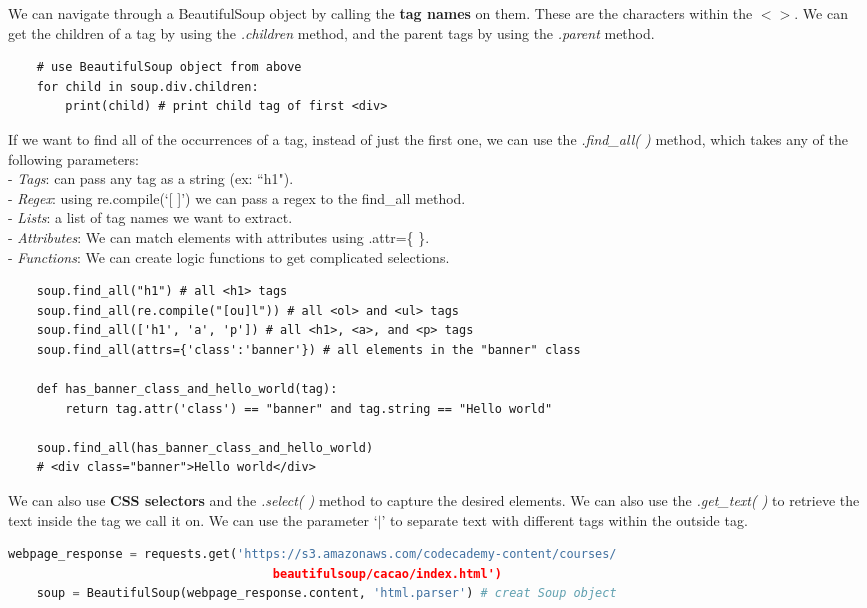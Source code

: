 \documentclass[11pt, a4paper]{article}
\begin{document}
\begin{spacing}{1.1}
	\noindent We can navigate through a BeautifulSoup object by calling the \textbf{tag names} on them. These are the characters within the $< >$. We can get the children of a tag by using the \textit{.children} method, and the parent tags by using the \textit{.parent} method.
	\begin{lstlisting}
	# use BeautifulSoup object from above
	for child in soup.div.children:
		print(child) # print child tag of first <div> \end{lstlisting}\vspace*{1mm} 
	If we want to find all of the occurrences of a tag, instead of just the first one, we can use the \textit{.find\_all( )} method, which takes any of the following parameters: \\
	\hspace*{3mm} - \textit{Tags}: can pass any tag as a string (ex: ``h1"). \\
	\hspace*{3mm} - \textit{Regex}: using re.compile(`[ ]') we can pass a regex to the find\_all method. \\
	\hspace*{3mm} - \textit{Lists}: a list of tag names we want to extract. \\
	\hspace*{3mm} - \textit{Attributes}: We can match elements with attributes using .attr=\{ \}. \\
	\hspace*{3mm} - \textit{Functions}: We can create logic functions to get complicated selections.
	\begin{lstlisting}
	soup.find_all("h1") # all <h1> tags
	soup.find_all(re.compile("[ou]l")) # all <ol> and <ul> tags
	soup.find_all(['h1', 'a', 'p']) # all <h1>, <a>, and <p> tags
	soup.find_all(attrs={'class':'banner'}) # all elements in the "banner" class
	
	def has_banner_class_and_hello_world(tag):
		return tag.attr('class') == "banner" and tag.string == "Hello world"
	
	soup.find_all(has_banner_class_and_hello_world) 
	# <div class="banner">Hello world</div>	\end{lstlisting}\vspace*{1mm}
	We can also use \textbf{CSS selectors} and the \textit{.select( )} method to capture the desired elements. We can also use the \textit{.get\_text( )} to retrieve the text inside the tag we call it on. We can use the parameter `$|$' to separate text with different tags within the outside tag. 
	\begin{lstlisting}[language=Python]
	webpage_response = requests.get('https://s3.amazonaws.com/codecademy-content/courses/
	                                 beautifulsoup/cacao/index.html')
	soup = BeautifulSoup(webpage_response.content, 'html.parser') # creat Soup object
	

\end{lstlisting}
\end{spacing}
\end{document}
